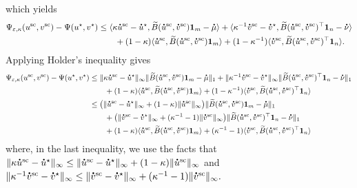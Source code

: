 which yields 
\begin{align*}
\Psi_{\varepsilon, \kappa} (u^{\text{sc}} ,v^{\text{sc}}) -\Psi(u^\star, v^\star)
&\leq  \inr{\kappa \dt{u}^{\text{sc}} - \dt{u}^{\star}, \widetilde{B}(\dt{u}^{\text{sc}} ,\dt{v}^{\text{sc}})\mathbf 1_m - \dt{\mu}} +\inr{\kappa^{-1}\dt{v}^{\text{sc}} - \dt{v}^{\star}, \widetilde{B}(\dt{u}^{\text{sc}} ,\dt{v}^{\text{sc}})^\top\mathbf 1_n - \dt{\nu}}\\
&\qquad + (1- \kappa)\inr{\dt{u}^{\text{sc}} ,\widetilde{B}(\dt{u}^{\text{sc}} ,\dt{v}^{\text{sc}})\mathbf 1_m} + (1- \kappa^{-1})\inr{\dt{v}^{\text{sc}} ,\widetilde{B}(\dt{u}^{\text{sc}} ,\dt{v}^{\text{sc}})^\top\mathbf 1_n}.
\end{align*}
Applying Holder's inequality gives 
\begin{align*}
\Psi_{\varepsilon, \kappa}(u^{\text{sc}} ,v^{\text{sc}}) -\Psi(u^\star, v^\star)
&\leq \norm{\kappa \dt{u}^{\text{sc}} - \dt{u}^\star}_\infty \norm{\widetilde{B}(\dt{u}^{\text{sc}} ,\dt{v}^{\text{sc}})\mathbf 1_m - \dt{\mu}}_1 + \norm{\kappa^{-1}\dt{v}^{\text{sc}} - \dt{v}^\star}_\infty \norm{\widetilde{B}(\dt{u}^{\text{sc}} ,\dt{v}^{\text{sc}})^\top\mathbf 1_n - \dt{\nu}}_1\\
&\qquad + (1- \kappa)\inr{\dt{u}^{\text{sc}} ,\widetilde{B}(\dt{u}^{\text{sc}} ,\dt{v}^{\text{sc}})\mathbf 1_m} + (1- \kappa^{-1})\inr{\dt{v}^{\text{sc}} ,\widetilde{B}(\dt{u}^{\text{sc}} ,\dt{v}^{\text{sc}})^\top\mathbf 1_n}\\
&\leq \big(\norm{\dt{u}^{\text{sc}} - \dt{u}^\star}_\infty + (1 - \kappa) \norm{\dt{u}^{\text{sc}}}_\infty\big)\norm{\widetilde{B}(\dt{u}^{\text{sc}} ,\dt{v}^{\text{sc}})\mathbf 1_m - \dt{\mu}}_1\\
&\qquad + \big(\norm{\dt{v}^{\text{sc}} - \dt{v}^\star}_\infty + (\kappa^{-1} -1) \norm{\dt{v}^{\text{sc}}}_\infty\big) \norm{\widetilde{B}(\dt{u}^{\text{sc}} ,\dt{v}^{\text{sc}})^\top\mathbf 1_n - \dt{\nu}}_1\\
&\qquad + (1- \kappa)\inr{\dt{u}^{\text{sc}} ,\widetilde{B}(\dt{u}^{\text{sc}} ,\dt{v}^{\text{sc}})\mathbf 1_m} + (\kappa^{-1}- 1)\inr{\dt{v}^{\text{sc}} ,\widetilde{B}(\dt{u}^{\text{sc}} ,\dt{v}^{\text{sc}})^\top\mathbf 1_n}
\end{align*}
where, in the last inequality, we use the facts that $\norm{\kappa\dt{u}^{\text{sc}} - \dt{u}^\star}_\infty \leq \norm{\dt{u}^{\text{sc}} - \dt{u}^\star}_\infty + (1 - \kappa) \norm{\dt{u}^{\text{sc}}}_\infty$ and $\norm{\kappa^{-1}\dt{v}^{\text{sc}} - \dt{v}^\star}_\infty \leq \norm{\dt{v}^{\text{sc}} - \dt{v}^\star}_\infty + (\kappa^{-1} -1) \norm{\dt{v}^{\text{sc}}}_\infty.$
